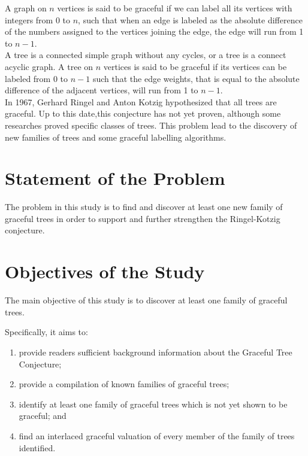 \documentclass[12pt]{report}
\theoremstyle{definition}
\def\indent{\hspace*{.5cm}}
\begin{document}
\indent A graph on $n$ vertices is said to be graceful if we can label all its vertices with integers from 0 to $n$, such that when an edge is labeled as the absolute difference of the numbers assigned to the vertices joining the edge, the edge will run from 1 to $n-1$.\\

\indent A tree is a connected simple graph without any cycles, or a tree is a connect acyclic graph. A tree on $n$ vertices is said to be graceful if its vertices can be labeled from 0 to $n-1$ such that the edge weights, that is equal to the absolute difference of the adjacent vertices, will run from 1 to $n-1$.\\

\indent In 1967, Gerhard Ringel and Anton Kotzig hypothesized that all trees are graceful. Up to this date,this conjecture has not yet proven, although some researches proved specific classes of trees. This problem lead to the discovery of new families of trees and some graceful labelling algorithms.

\section{Statement of the Problem}
\indent The problem in this study is to find and discover at least one new family of graceful trees in order to support and further strengthen the Ringel-Kotzig conjecture. 

\section{Objectives of the Study}
\indent
The main objective of this study is to discover at least one family of graceful
trees.

\par Speciﬁcally, it aims to:

\begin{enumerate}

\item \noindent provide readers sufficient background information about the Graceful Tree Conjecture;

\item \noindent provide a compilation of known families of graceful trees;

\item \noindent identify at least one family of graceful trees which is not yet shown to be graceful; and

\item \noindent ﬁnd an interlaced graceful valuation of every member of the family of trees identiﬁed.

\end{enumerate}
\end{document}

